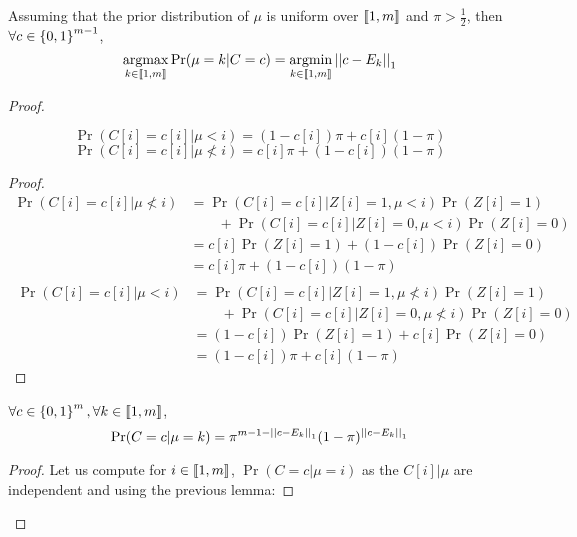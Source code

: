 \begin{thm}
    \label{thm:projection_appendix}
    Assuming that the prior distribution of $\mu$ is uniform over $\left\llbracket1, m\right\rrbracket$ and $\pi > \frac{1}{2}$, then \(\forall c \in \left\{ 0, 1 \right\}^{m-1}\),
    \[\operatorname*{argmax}_{k \in \left\llbracket1, m\right\rrbracket} \Pr(\mu = k | C = c) = \operatorname*{argmin}_{k \in \left\llbracket1, m\right\rrbracket} \left|\left|c - E_k\right|\right|_1\]
\end{thm}

\begin{proof}
\begin{lemma}
    \[ \Pr(C[i] = c[i] | \mu < i) = (1 - c[i]) \pi + c[i] (1 - \pi) \]
    \[ \Pr(C[i] = c[i] | \mu \not< i) = c[i] \pi + (1 - c[i]) (1 - \pi) \]
\end{lemma}
\begin{proof}
    \begin{align}
        \Pr(C[i] = c[i] | \mu \not< i)
        &= \Pr(C[i] = c[i] | Z[i] = 1, \mu < i) \Pr(Z[i] = 1) \\
        &\qquad + \Pr(C[i] = c[i] | Z[i] = 0, \mu < i) \Pr(Z[i] = 0)\\
        &= c[i] \Pr(Z[i] = 1) + (1 - c[i]) \Pr(Z[i] = 0)\\
        &= c[i] \pi + (1 - c[i]) (1 - \pi)\\
    \end{align}
    \begin{align}
        \ \Pr(C[i] = c[i] | \mu < i)
        &= \Pr(C[i] = c[i] | Z[i] = 1, \mu \not< i) \Pr(Z[i] = 1) \\
        & \qquad + \Pr(C[i] = c[i] | Z[i] = 0, \mu \not< i) \Pr(Z[i] = 0)\\
        &= (1 - c[i]) \Pr(Z[i] = 1) + c[i] \Pr(Z[i] = 0)\\
        &= (1 - c[i]) \pi + c[i] (1 - \pi)
    \end{align}
\end{proof}

\begin{lemma}
    \label{lemma:p_c_mu}
    $\forall c \in \left\{ 0, 1 \right\}^m, \forall k \in \left\llbracket1, m\right\rrbracket$,
    \[\Pr(C = c | \mu = k) = \pi^{m - 1 - \left|\left|c - E_k\right|\right|_1} (1 - \pi)^{\left|\left|c - E_k\right|\right|_1}\]
\end{lemma}
\begin{proof}
    Let us compute for $i \in \left\llbracket1, m\right\rrbracket$, $\Pr(C = c| \mu = i)$ as the $C[i] | \mu$ are independent and using the previous lemma:


\end{proof}
\end{proof}
